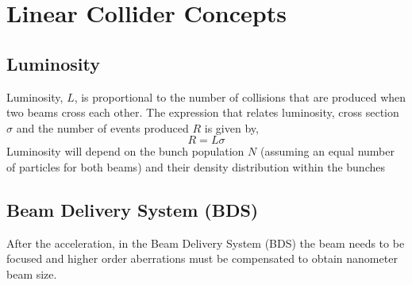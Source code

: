 \chapter{Linear Collider Concepts}
\section{Luminosity}
Luminosity, $L$, is proportional to the number of collisions that are produced when two beams cross each other. The expression that relates luminosity, cross section $\sigma$ and the number of events produced $R$ is given by,
\begin{equation}
 R=L\sigma
\end{equation}
Luminosity will depend on the bunch population 	$N$ (assuming an equal number of particles for both beams) and their density distribution within the bunches 
\section{Beam Delivery System (BDS)}
After the acceleration, in the Beam Delivery System (BDS) the beam needs to be focused and higher order aberrations must be compensated to obtain nanometer beam size. 
